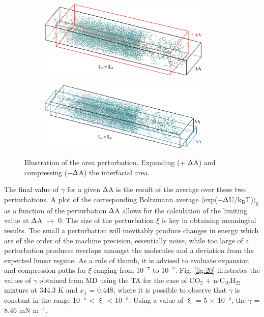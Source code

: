 \documentclass[9pt,bestpractices]{livecoms}
\begin{document}
\begin{figure}
  \centering
	\begin{subfigure}{\linewidth} %
    \includegraphics[width=0.9\textwidth]{gfx/image64.png}
	\end{subfigure}
	\begin{subfigure}{\linewidth} %
    \includegraphics[width=0.9\textwidth]{gfx/image65.png}
	\end{subfigure}
\caption{Illustration of the area perturbation. Expanding (+ {${\Updelta}$}A) and compressing (${-}${${\Updelta}$}A) the interfacial area.}
\label{fig:19}
\end{figure}

The final value of {${\gamma}$} for a given {\textbar}{${\Updelta}$}A{\textbar}
is the result of the average over these two perturbations. A plot of the
corresponding Boltzmann average
${\langle}$exp(${-}${${\Updelta}$}U/k$_{\mathrm{B}}$T)${\rangle}_{0}$ as
a function of the perturbation {\textbar}{${\Updelta}$}A{\textbar} allows for
the calculation of the limiting value at {${\Updelta}$}A ${\rightarrow}$ 0. The
size of the perturbation {${\xi}$} is key in obtaining meaningful results. Too
small a perturbation will inevitably produce changes in energy which are of the
order of the machine precision, essentially noise, while too large of
a perturbation produces overlaps amongst the molecules and a deviation from the
expected linear regime. As a rule of thumb, it is advised to evaluate expansion
and compression paths for {${\xi}$} ranging from 10$^{{-}7}$ to 10$^{{-}2}$.
Fig. \ref{fig:20} illustrates the values of {${\gamma}$} obtained from MD using the TA
for the case of CO$_{2}$ + n-C$_{10}$H$_{22}$ mixture at 344.3 K and
$x_{1}$ = 0.448, where it is possible to observe that {${\gamma}$} is
constant in the range 10$^{-5}$ {\textless} {${\upxi}$} {\textless} 10$^{-3}$.
Using a value of {${\upxi}$} = 5 ${\times}$ 10$^{-4}$, the {${\gamma}$} = 8.46
mN m$^{-1}$.\citep{muller2009} 
\end{document}
